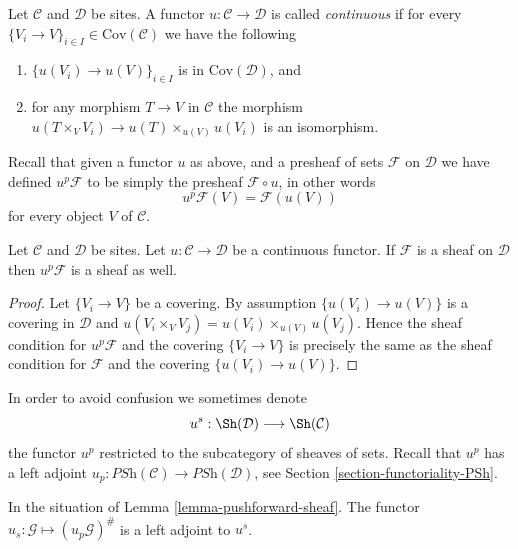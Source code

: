 \begin{definition}
\label{definition-continuous}
Let $\mathcal{C}$ and $\mathcal{D}$ be sites.
A functor $u : \mathcal{C} \to \mathcal{D}$ is called
{\it continuous} if for every
$\{V_i \to V\}_{i\in I} \in \text{Cov}(\mathcal{C})$
we have the following
\begin{enumerate}
\item $\{u(V_i) \to u(V)\}_{i\in I}$ is in $\text{Cov}(\mathcal{D})$, and
\item for any morphism $T \to V$ in $\mathcal{C}$ the morphism
$u(T \times_V V_i) \to u(T) \times_{u(V)} u(V_i)$ is an isomorphism.
\end{enumerate}
\end{definition}

\noindent
Recall that given a functor $u$ as above, and a presheaf of sets
$\mathcal{F}$ on $\mathcal{D}$ we have defined
$u^p\mathcal{F}$ to be simply the presheaf
$\mathcal{F} \circ u$, in other words
$$
u^p\mathcal{F} (V) = \mathcal{F}(u(V))
$$
for every object $V$ of $\mathcal{C}$.

\begin{lemma}
\label{lemma-pushforward-sheaf}
Let $\mathcal{C}$ and $\mathcal{D}$ be sites.
Let $u : \mathcal{C} \to \mathcal{D}$ be a continuous functor.
If $\mathcal{F}$ is a sheaf on $\mathcal{D}$ then
$u^p\mathcal{F}$ is a sheaf as well.
\end{lemma}

\begin{proof}
Let $\{V_i \to V\}$ be a covering.
By assumption $\{u(V_i) \to u(V)\}$ is a covering
in $\mathcal{D}$ and $u(V_i \times_V V_j) =
u(V_i)\times_{u(V)}u(V_j)$. Hence the sheaf condition for
$u^p\mathcal{F}$ and the covering $\{V_i \to V\}$
is precisely the same as the sheaf condition for $\mathcal{F}$
and the covering $\{u(V_i) \to u(V)\}$.
\end{proof}

\noindent
In order to avoid confusion we sometimes denote
$$
u^s :
\Sh(\mathcal{D})
\longrightarrow
\Sh(\mathcal{C})
$$
the functor $u^p$ restricted to the subcategory of sheaves of sets.
Recall that $u^p$ has a left adjoint
$u_p : \textit{PSh}(\mathcal{C}) \to \textit{PSh}(\mathcal{D})$, see
Section \ref{section-functoriality-PSh}.

\begin{lemma}
\label{lemma-adjoint-sheaves}
In the situation of Lemma \ref{lemma-pushforward-sheaf}.
The functor $u_s : \mathcal{G} \mapsto (u_p \mathcal{G})^\#$
is a left adjoint to $u^s$.
\end{lemma}


